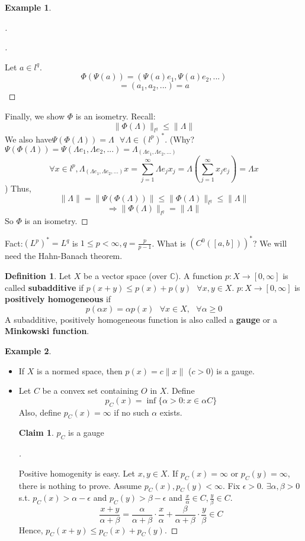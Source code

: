 \documentclass{article}
\theoremstyle{definition}
\newtheorem{ex}{Example}
\newtheorem{dfn}{Definition}
\newtheorem*{clm}{Claim}
\newenvironment{proofs}[1][\proofname]{%
  \begin{proof}[#1]$ $\par\nobreak\ignorespaces
}{%
  \end{proof}
}
\newcommand{\sfa}{\text{  } \forall}
\begin{document}
\begin{ex}
\begin{proofs}
		\begin{proofs}
			Let $a \in l^q$.
			\[
				\Phi(\Psi(a)) = (\Psi(a) e_1, \Psi(a) e_2, ...) 
			\]
			\[
				= (a_1, a_2, ...) = a
			\]
		\end{proofs}
	Finally, we show $\Phi$ is an isometry.
	Recall: 
	\[
		\|\Phi(\Lambda)\|_{l^q} \leq \|\Lambda\|
	\]
	We also have$\Psi(\Phi(\Lambda)) = \Lambda \sfa \Lambda \in (l^p)^*$. (Why? $\Psi(\Phi(\Lambda)) = \Psi(\Lambda e_1, \Lambda e_2, ...) = \Lambda_{(\Lambda e_1, \Lambda e_2, ...)}$
	\[
		\forall x \in l^p, \Lambda_{(\Lambda e_1, \Lambda e_2, ...)} x = \sum_{j = 1}^\infty \Lambda e_j x_j = \Lambda \left(\sum_{j = 1}^\infty x_j e_j\right) = \Lambda x
	\]
	) Thus, 
	\[
		\| \Lambda \| = \|\Psi(\Phi(\Lambda))\| \leq \|\Phi(\Lambda)\|_{l^q} \leq \|\Lambda\|
	\]
	\[
		\Rightarrow \|\Phi(\Lambda)\|_{l^q} = \|\Lambda\|
	\]
	So $\Phi$ is an isometry.
	\end{proofs}
\end{ex}

Fact:$(L^p)^* = L^q$ is $1 \leq p < \infty, q = \frac{p}{p - 1}$.
What is $(C^0([a , b]))^*$?
We will need the Hahn-Banach theorem.
\begin{dfn}
	Let $X$ be a vector space (over $\mathbb{C}$). A function $p: X \to [0, \infty]$ is called \textbf{subadditive} if $p(x+y) \leq p(x) + p(y) \sfa x, y \in X$.
	$p:X \to [0, \infty]$ is \textbf{positively homogeneous} if 
	\[
		p(\alpha x) = \alpha p(x) \sfa x \in X, \sfa \alpha \geq 0
	\]
	A subadditive, positively homogeneous function is also called a \textbf{gauge} or a \textbf{Minkowski function}.
\end{dfn}

\begin{ex}
	\begin{itemize}
		\item If $X$ is a normed space, then $p(x)= c \|x\|$ ($c > 0$) is a gauge.

		\item Let $C$ be a convex set containing $O$ in $X$. Define 
			\[
				p_C(x) = \inf \{\alpha > 0: x \in \alpha C\}
			\]
			Also, define $p_C(x) = \infty$ if no such $\alpha$ exists.
			\begin{clm}
				$p_C$ is a gauge
			\end{clm}

			\begin{proofs}
				Positive homogenity is easy. 
				Let $x, y \in X$. If $p_C(x) = \infty$ or $p_C(y) = \infty$, there is nothing to prove.
				Assume $p_C(x), p_C(y) < \infty$.
				Fix $\epsilon > 0$.
				$\exists \alpha, \beta > 0$ s.t. $p_C(x) > \alpha - \epsilon$ and $p_C(y) > \beta - \epsilon$ and $\frac{x}{\alpha} \in C, \frac{y}{\beta} \in C$.
				\[
					\frac{x + y}{\alpha + \beta} = \frac{\alpha}{\alpha + \beta} \cdot \frac{x}{\alpha} + \frac{\beta}{\alpha + \beta} \cdot \frac{y}{\beta} \in C
				\]
				Hence, $p_C(x+y) \leq p_C(x) + p_C(y)$.
			\end{proofs}
	\end{itemize}
\end{ex}
\end{document}
